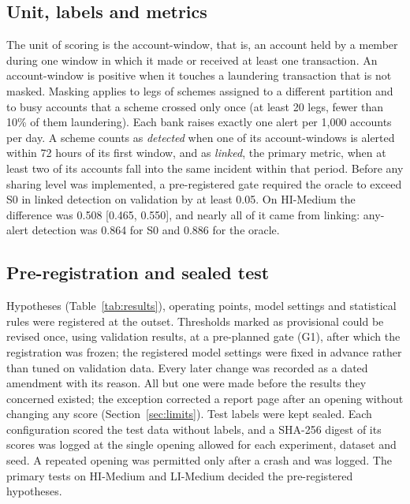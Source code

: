 \documentclass[conference]{IEEEtran}
\begin{document}


\subsection{Unit, labels and metrics}
The unit of scoring is the account-window, that is, an account held by a member during one
window in which it made or received at least one transaction. An account-window is positive
when it touches a laundering transaction that is not masked. Masking applies to legs of
schemes assigned to a different partition and to busy accounts that a scheme crossed only
once (at least 20 legs, fewer than 10\% of them laundering). Each bank raises exactly one
alert per 1,000 accounts per day. A scheme counts as \emph{detected} when one of its
account-windows is alerted within 72 hours of its first window, and as \emph{linked}, the
primary metric, when at least two of its accounts fall into the same incident within that
period. Before any sharing level was implemented, a pre-registered gate required the oracle
to exceed S0 in linked detection on validation by at least 0.05. On HI-Medium the difference
was 0.508 [0.465, 0.550], and nearly all of it came from linking: any-alert detection was
0.864 for S0 and 0.886 for the oracle.

\subsection{Pre-registration and sealed test}
Hypotheses (Table~\ref{tab:results}), operating points, model settings and statistical
rules were registered at the outset. Thresholds marked as provisional could be revised once,
using validation results, at a pre-planned gate (G1), after which the registration was
frozen; the registered model settings were fixed in advance rather than tuned on validation
data. Every later change was recorded as a dated amendment with its reason. All but one were
made before the results they concerned existed; the exception corrected a report page after
an opening without changing any score (Section~\ref{sec:limits}). Test labels
were kept sealed. Each configuration scored the test data without labels, and a SHA-256
digest of its scores was logged at the single opening allowed for each experiment, dataset
and seed. A repeated opening was permitted only after a crash and was logged. The primary
tests on HI-Medium and LI-Medium decided the pre-registered hypotheses.
\end{document}
